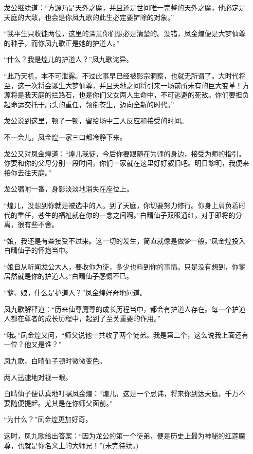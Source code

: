 \begin{this_body}
龙公继续道：“方源乃是天外之魔，并且还是世间唯一完整的天外之魔，他必定是天庭的大敌，也会是你凤九歌的此生必定要铲除的对象。”

“我平生只收徒两位，这里的深意你们想必是清楚的。没错，凤金煌便是大梦仙尊的种子，而你凤九歌正是她的护道人。”

“什么？我是煌儿的护道人？”凤九歌诧异。

“此乃天机，本不可泄露。不过此事早已经被影宗洞察，也就无所谓了。大时代将至，这一次将会诞生大梦仙尊，并且天地之间将引来一场前所未有的巨大变革！方源将是我天庭的拦路石，也是你们父女两人生命中，不可逃避的死敌。你们要担负起命运交托于肩头的重任，领衔苍生，迈向全新的时代。”

龙公说到这里，顿了一顿，留给场中三人反应和接受的时间。

不一会儿，凤金煌一家三口都冷静下来。

龙公又对凤金煌道：“煌儿我徒，今后你要跟随在为师的身边，接受为师的指引。你要和你的父母分别一段时间，你们一家就在这里好好叙旧吧。明日黎明，我便来接你去往天庭。”

龙公嘱咐一番，身影淡淡地消失在座位上。

“煌儿，没想到你就是被选中的人。到了天庭，你切要努力修行。你身上肩负着时代的重任，苍生的福祉就在你的一念之间啊。”白晴仙子双眼通红，对于即将的分离，很有些不舍。

“娘，我还是有些接受不过来。这一切的发生，简直就像是做梦一般。”凤金煌投入白晴仙子的怀抱当中。

“娘自从听闻龙公大人，要收你为徒，多少也料到你的事情。只是没有想到，你爹居然就是你的护道人。”白晴仙子感慨不已。

“爹、娘，什么是护道人？”凤金煌好奇地问道。

凤九歌解释道：“历来仙尊魔尊的成长历程当中，都会有护道人存在。每一个护道人都在尊者的成长历程中，起到了至关重要的作用。”

“哦。”凤金煌又问，“师父说他一共收了两个徒弟。我是第二个，这么说我上面还有一位？他又是谁？”

凤九歌、白晴仙子顿时微微变色。

两人迅速地对视一眼。

白晴仙子便认真地叮嘱凤金煌：“煌儿，这是一个忌讳，将来你到达天庭，千万不要随便提起。尤其是在你师父面前。”

“为什么？”凤金煌更加好奇。

这时，凤九歌给出答案：“因为龙公的第一个徒弟，便是历史上最为神秘的红莲魔尊，也就是你名义上的大师兄！”(未完待续。)

\end{this_body}

